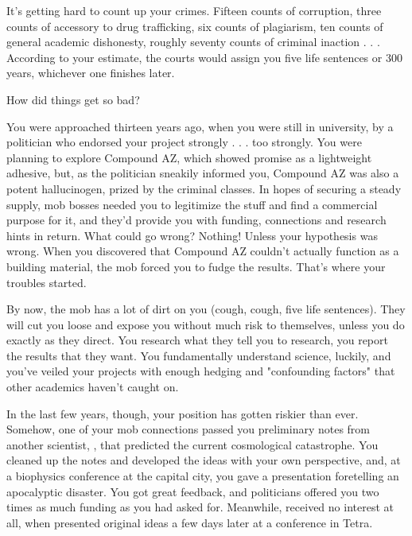 \documentclass[char]{guildcamp3}
\begin{document}
\name{\cSciOne{}}



It’s getting hard to count up your crimes. Fifteen counts of corruption, three counts of accessory to drug trafficking, six counts of plagiarism, ten counts of general academic dishonesty, roughly seventy counts of criminal inaction . . . According to your estimate, the courts would assign you five life sentences or 300 years, whichever one finishes later.

How did things get so bad?

You were approached thirteen years ago, when you were still in university, by a politician who endorsed your project strongly . . . too strongly. You were planning to explore Compound AZ, which showed promise as a lightweight adhesive, but, as the politician sneakily informed you, Compound AZ was also a potent hallucinogen, prized by the criminal classes. In hopes of securing a steady supply, mob bosses needed you to legitimize the stuff and find a commercial purpose for it, and they'd provide you with funding, connections and research hints in return. What could go wrong? Nothing! Unless your hypothesis was wrong. When you discovered that Compound AZ couldn't actually function as a building material, the mob forced you to fudge the results. That's where your troubles started.

By now, the mob has a lot of dirt on you (cough, cough, five life sentences). They will cut you loose and expose you without much risk to themselves, unless you do exactly as they direct. You research what they tell you to research, you report the results that they want. You fundamentally understand science, luckily, and you've veiled your projects with enough hedging and "confounding factors" that other academics haven't caught on. 

In the last few years, though, your position has gotten riskier than ever. Somehow, one of your mob connections passed you preliminary notes from another scientist, \cSciTwo{}, that predicted the current cosmological catastrophe. You cleaned up the notes and developed the ideas with your own perspective, and, at a biophysics conference at the capital city, you gave a presentation foretelling an apocalyptic disaster. You got great feedback, and politicians offered you two times as much funding as you had asked for. Meanwhile, \cSciTwo{} received no interest at all, when \cSciTwo{\they} presented \cSciTwo{\their} original ideas a few days later at a conference in Tetra.
\end{document}
